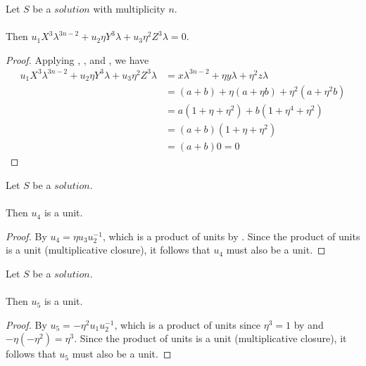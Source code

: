\begin{lemma}
    \label{lmm:formula1}
    \leanok
    Let $S$ be a $solution$ with multiplicity $n$.\\\\
    Then $u_1 X^3 \lambda^{3n-2}+u_2 \eta Y^3 \lambda +
    u_3 \eta^2 Z^3 \lambda = 0$.
\end{lemma}
\begin{proof}
    \leanok
    Applying , ,
     and , we have
    \begin{align*}
        u_1 X^3 \lambda^{3n-2}+u_2 \eta Y^3 \lambda + u_3 \eta^2 Z^3 \lambda
        &= x \lambda^{3n-2} + \eta y \lambda + \eta^2 z \lambda \\
        &= (a+b) + \eta (a+\eta b) + \eta^2 (a+\eta^2 b) \\
        &= a (1 + \eta + \eta^2) + b (1 + \eta^4 + \eta^2) \\
        &= (a+b)(1+\eta+\eta^2)\\
        &= (a+b)0 = 0
    \end{align*}
\end{proof}

\begin{lemma}
    \label{lmm:u₄_isUnit}
    \leanok
    Let $S$ be a $solution$.\\\\
    Then $u_4$ is a unit.
\end{lemma}
\begin{proof}
    \leanok
    By  $u_4 = \eta u_3 u_2^{-1}$,
    which is a product of units by .
    Since the product of units is a unit (multiplicative closure),
    it follows that $u_4$ must also be a unit.
\end{proof}

\begin{lemma}
    \label{lmm:u₅_isUnit}
    \leanok
    Let $S$ be a $solution$.\\\\
    Then $u_5$ is a unit.
\end{lemma}
\begin{proof}
    \leanok
    By  $u_5 = -\eta^2 u_1 u_2^{-1}$,
    which is a product of units since $\eta^3 = 1$ by  and
    $-\eta (-\eta^2) = \eta^3$.
    Since the product of units is a unit (multiplicative closure),
    it follows that $u_5$ must also be a unit.
\end{proof}

